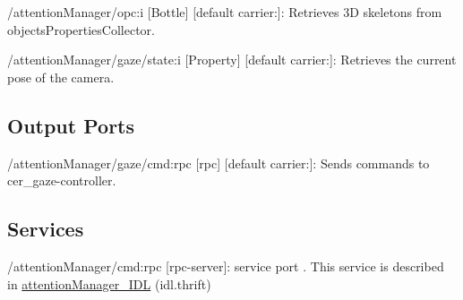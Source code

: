 \begin{DoxyItemize}
\item /attention\+Manager/opc\+:i \mbox{[}Bottle\mbox{]} \mbox{[}default carrier\+:\mbox{]}\+: Retrieves 3D skeletons from objects\+Properties\+Collector.
\item /attention\+Manager/gaze/state\+:i \mbox{[}Property\mbox{]} \mbox{[}default carrier\+:\mbox{]}\+: Retrieves the current pose of the camera.
\end{DoxyItemize}\hypertarget{group__skeletonViewer_outputports_sec}{}\subsection{Output Ports}\label{group__skeletonViewer_outputports_sec}

\begin{DoxyItemize}
\item /attention\+Manager/gaze/cmd\+:rpc \mbox{[}rpc\mbox{]} \mbox{[}default carrier\+:\mbox{]}\+: Sends commands to cer\+\_\+gaze-\/controller.
\end{DoxyItemize}\hypertarget{group__skeletonViewer_services_sec}{}\subsection{Services}\label{group__skeletonViewer_services_sec}

\begin{DoxyItemize}
\item /attention\+Manager/cmd\+:rpc \mbox{[}rpc-\/server\mbox{]}\+: service port . This service is described in \mbox{\hyperlink{classattentionManager__IDL}{attention\+Manager\+\_\+\+I\+DL}} (idl.\+thrift) 
\end{DoxyItemize}